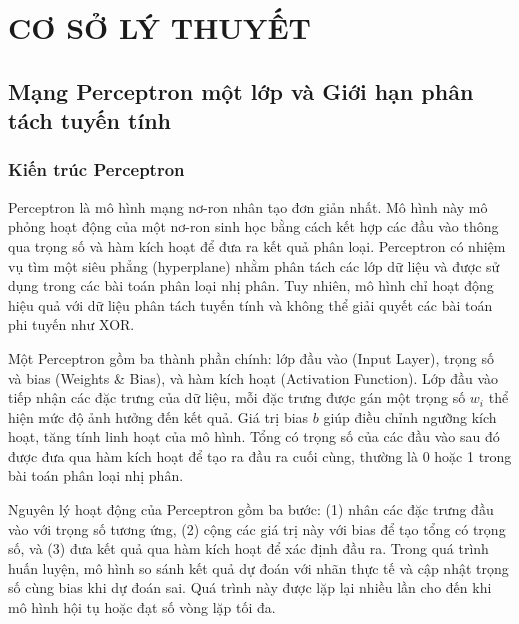 \documentclass[12pt,a4paper]{report}
\begin{document}
\chapter{CƠ SỞ LÝ THUYẾT}

\section{Mạng Perceptron một lớp và Giới hạn phân tách tuyến tính}
\subsection{Kiến trúc Perceptron}
Perceptron là mô hình mạng nơ-ron nhân tạo đơn giản nhất. Mô hình này mô phỏng hoạt động của một nơ-ron sinh học bằng cách kết hợp các đầu vào thông qua trọng số và hàm kích hoạt để đưa ra kết quả phân loại. Perceptron có nhiệm vụ tìm một siêu phẳng (hyperplane) nhằm phân tách các lớp dữ liệu và được sử dụng trong các bài toán phân loại nhị phân. Tuy nhiên, mô hình chỉ hoạt động hiệu quả với dữ liệu phân tách tuyến tính và không thể giải quyết các bài toán phi tuyến như XOR.

Một Perceptron gồm ba thành phần chính: lớp đầu vào (Input Layer), trọng số và bias (Weights \& Bias), và hàm kích hoạt (Activation Function). Lớp đầu vào tiếp nhận các đặc trưng của dữ liệu, mỗi đặc trưng được gán một trọng số $w_i$ thể hiện mức độ ảnh hưởng đến kết quả. Giá trị bias $b$ giúp điều chỉnh ngưỡng kích hoạt, tăng tính linh hoạt của mô hình. Tổng có trọng số của các đầu vào sau đó được đưa qua hàm kích hoạt để tạo ra đầu ra cuối cùng, thường là 0 hoặc 1 trong bài toán phân loại nhị phân.

Nguyên lý hoạt động của Perceptron gồm ba bước: (1) nhân các đặc trưng đầu vào với trọng số tương ứng, (2) cộng các giá trị này với bias để tạo tổng có trọng số, và (3) đưa kết quả qua hàm kích hoạt để xác định đầu ra. Trong quá trình huấn luyện, mô hình so sánh kết quả dự đoán với nhãn thực tế và cập nhật trọng số cùng bias khi dự đoán sai. Quá trình này được lặp lại nhiều lần cho đến khi mô hình hội tụ hoặc đạt số vòng lặp tối đa.
\end{document}
